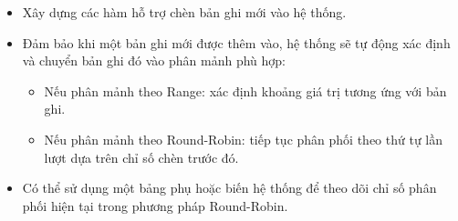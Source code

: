 \documentclass[14pt]{extarticle}
\begin{document}
\begin{itemize}
\begin{itemize}
\begin{itemize}
            \item Xây dựng các hàm hỗ trợ chèn bản ghi mới vào hệ thống.
            \item Đảm bảo khi một bản ghi mới được thêm vào, hệ thống sẽ tự động xác định và chuyển bản ghi đó vào phân mảnh phù hợp:
            \begin{itemize}
                \item Nếu phân mảnh theo Range: xác định khoảng giá trị tương ứng với bản ghi.
                \item Nếu phân mảnh theo Round-Robin: tiếp tục phân phối theo thứ tự lần lượt dựa trên chỉ số chèn trước đó.
            \end{itemize}
            \item Có thể sử dụng một bảng phụ hoặc biến hệ thống để theo dõi chỉ số phân phối hiện tại trong phương pháp Round-Robin.
        \end{itemize}
    \end{itemize}
\end{itemize}
\end{document}
